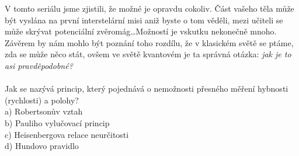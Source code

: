 \documentclass[crop=false]{standalone}
\begin{document}
V tomto seriálu jsme zjistili, že možné je opravdu cokoliv. Část vašeho těla může být vyslána na první interstelární misi aniž 
byste o tom věděli, mezi učiteli se může skrývat potenciální zvěromág\dots Možností je vskutku nekonečně mnoho. Závěrem by nám 
mohlo být poznání toho rozdílu, že v klasickém světě se ptáme, zda se může něco stát, ovšem ve světě kvantovém je ta správná 
otázka: \textit{jak je to asi pravděpodobné?}
\\
\\
Jak se nazývá princip, který pojednává o nemožnosti přesného měření hybnosti (rychlosti) a polohy?
\\

a) Robertsonův vztah
\\

b) Pauliho vylučovací princip
\\

c) Heisenbergova relace neurčitosti
\\

d) Hundovo pravidlo
\end{document}
